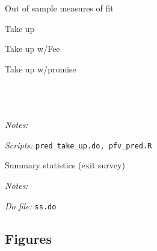 \documentclass[11pt]{article}
\begin{document}
\begin{table}[H]
    \caption{Out of sample measures of fit}
    \label{Table_compliance}
    \begin{subtable}{1\textwidth}
      \centering
        \caption{Take up}
        \scriptsize{}
    \end{subtable}%
    
    \bigskip
    \begin{subtable}{1\textwidth}
      \centering
        \caption{Take up w/Fee}
        \scriptsize{}
    \end{subtable}
    
      \bigskip
    \begin{subtable}{1\textwidth}
      \centering
        \caption{Take up w/promise}
        \scriptsize{}
    \end{subtable}
            \scriptsize
           \\
           \\
           \\
  \textit{Notes:} 
    
     \textit{Scripts: } \texttt{pred\_take\_up.do, pfv\_pred.R}
\end{table}



\begin{table}[H]
\caption{Summary statistics (exit survey)}
\label{SS_exit}
\begin{center}
\scriptsize{}
\end{center}
 \footnotesize
\textit{Notes:} 

\textit{Do file: } \texttt{ss.do}
\end{table}


\pagebreak



\subsection{Figures}
\end{document}
